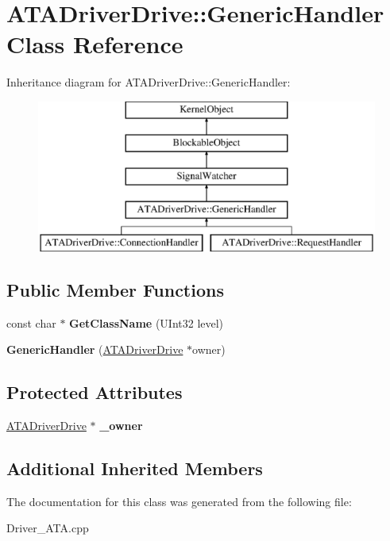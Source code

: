 \hypertarget{class_a_t_a_driver_drive_1_1_generic_handler}{}\section{A\+T\+A\+Driver\+Drive\+:\+:Generic\+Handler Class Reference}
\label{class_a_t_a_driver_drive_1_1_generic_handler}
Inheritance diagram for A\+T\+A\+Driver\+Drive\+:\+:Generic\+Handler\+:\begin{figure}[H]
\begin{center}
\leavevmode
\includegraphics[height=5.000000cm]{class_a_t_a_driver_drive_1_1_generic_handler}
\end{center}
\end{figure}
\subsection*{Public Member Functions}
\begin{DoxyCompactItemize}
\item 
\mbox{\label{class_a_t_a_driver_drive_1_1_generic_handler_a7998229768c9be84cf6162f52815e5b4}} 
const char $\ast$ {\bfseries Get\+Class\+Name} (U\+Int32 level)
\item 
\mbox{\label{class_a_t_a_driver_drive_1_1_generic_handler_affba10bc475e4b471ce76f4e76206e0f}} 
{\bfseries Generic\+Handler} (\hyperlink{class_a_t_a_driver_drive}{A\+T\+A\+Driver\+Drive} $\ast$owner)
\end{DoxyCompactItemize}
\subsection*{Protected Attributes}
\begin{DoxyCompactItemize}
\item 
\mbox{\label{class_a_t_a_driver_drive_1_1_generic_handler_a0e1a78771ea3f6c40925d9dfe0f6d34c}} 
\hyperlink{class_a_t_a_driver_drive}{A\+T\+A\+Driver\+Drive} $\ast$ {\bfseries \+\_\+owner}
\end{DoxyCompactItemize}
\subsection*{Additional Inherited Members}


The documentation for this class was generated from the following file\+:\begin{DoxyCompactItemize}
\item 
Driver\+\_\+\+A\+T\+A.\+cpp\end{DoxyCompactItemize}
